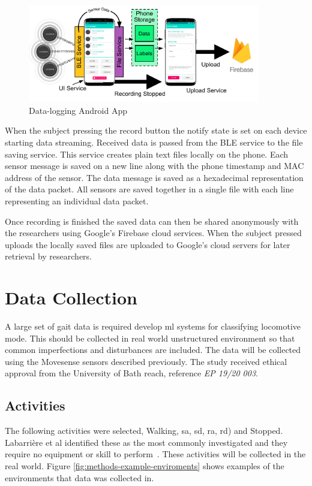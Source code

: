 \begin{figure}[hbt]
    \centering
    \includegraphics[width=0.9\textwidth]{content/3-Methods/Android_App.pdf}
    \caption{Data-logging Android App}
    \label{fig:methods-android-app}
\end{figure}

When the subject pressing the record button the notify state is set on each device starting data streaming. Received data is passed from the BLE service to the file saving service. This service creates plain text files locally on the phone. Each sensor message is saved on a new line along with the phone timestamp and MAC address of the sensor. The data message is saved as a hexadecimal representation of the data packet. All sensors are saved together in a single file with each line representing an individual data packet.

Once recording is finished the saved data can then be shared anonymously with the researchers using Google's Firebase cloud services. When the subject pressed uploads the locally saved files are uploaded to Google's cloud servers for later retrieval by researchers.


\section{Data Collection}
\label{sec:methods-data-collection}
A large set of gait data is required develop \acrshort{ml} systems for classifying locomotive mode. This should be collected in real world unstructured environment so that common imperfections and disturbances are included. The data will be collected using the Movesense sensors described previously. The study received ethical approval from the University of Bath \acrfull{reach}, reference \textit{EP 19/20 003}.

\subsection{Activities}
The following activities were selected, Walking, \acrfull{sa}, \acrfull{sd}, \acrfull{ra}, \acrfull{rd}) and Stopped. Labarri\`ere et al identified these as the most commonly investigated and they require no equipment or skill to perform~\cite{Labarriere2020}. These activities will be collected in the real world. Figure \ref{fig:methods-example-enviroments} shows examples of the environments that data was collected in.

